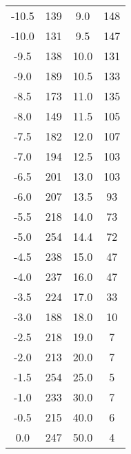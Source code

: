 \begin{table}
\begin{tabular}{c c || c c}
            -10.5  &      139   &   9.0       &     148   \\      
            -10.0    &      131   &   9.5     &     147   \\   
            -9.5   &      138   &   10.0      &     131   \\      
            -9.0     &      189   &   10.5    &     133   \\      
            -8.5   &      173   &   11.0      &     135   \\      
            -8.0     &      149   &   11.5    &     105   \\      
            -7.5   &      182   &   12.0      &     107   \\      
            -7.0     &      194   &   12.5    &     103   \\      
            -6.5   &      201   &   13.0      &     103   \\      
            -6.0     &      207   &   13.5    &     93    \\     
            -5.5   &      218   &   14.0      &     73    \\     
            -5.0     &      254   &   14.4    &     72    \\     
            -4.5   &      238   &   15.0      &     47    \\     
            -4.0     &      237   &   16.0      &     47    \\     
            -3.5   &      224   &   17.0     &     33    \\     
            -3.0     &      188   &   18.0      &     10    \\     
            -2.5   &      218   &   19.0      &     7     \\    
            -2.0     &      213   &   20.0      &     7     \\    
            -1.5   &      254   &   25.0      &     5     \\    
            -1.0     &      233   &   30.0      &     7     \\    
            -0.5   &      215   &   40.0      &     6     \\    
            0.0      &      247   &   50.0      &     4     \\      
    \end{tabular}
\end{table}
 
